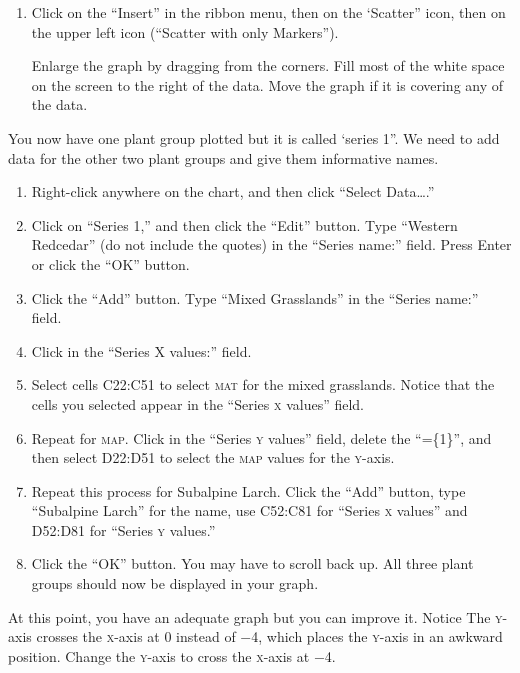\documentclass[12pt, hidelinks]{exam}
\newcommand*\axis[1]{{\scshape #1}-axis}
\begin{document}
\begin{questions}
\begin{enumerate}
	\item Click on the “Insert” in the ribbon menu, then on the ‘Scatter” icon, then on the upper left icon (“Scatter with only Markers”).

	Enlarge the graph by dragging from the corners. Fill most of the white space on the screen to the right of the data. Move the graph if it is covering any of the data. 
\end{enumerate}

You now have one plant group plotted but it is called ‘series 1”. We need to add data for the other two plant groups and give them informative names. 

\begin{enumerate}[resume]
	\item Right-click anywhere on the chart, and then click “Select Data\dots.”

	\item Click on “Series 1,” and then click the “Edit” button. Type “Western Redcedar” (do not include the quotes) in the “Series name:” field. Press Enter or click the “OK” button.

	\item Click the “Add” button. Type “Mixed Grasslands” in the “Series name:” field.

	\item Click in the “Series X values:” field.

	\item Select cells {\liningnum C22:C51} to select \textsc{mat} for the mixed grasslands. Notice that the cells you selected appear in the “Series \textsc{x} values” field.

	\item Repeat for \textsc{map}. Click in the “Series \textsc{y} values” field, delete the “=\{1\}”, and then select {\liningnum D22:D51} to select the \textsc{map} values for the \axis{y}. 

	\item Repeat this process for Subalpine Larch. Click the “Add” button, type “Subalpine Larch” for the name, use {\liningnum C52:C81} for “Series \textsc{x} values” and D52:D81 for “Series \textsc{y} values.” 

	\item Click the “OK” button. You may have to scroll back up. All three plant groups should now be displayed in your graph. 
\end{enumerate}

At this point, you have an adequate graph but you can improve it. Notice The \axis{y} crosses the \axis{x} at 0 instead of $-$4, which places the \axis{y} in an awkward position. Change the \axis{y} to cross the \axis{x} at $-$4.


\end{questions}
\end{document}
